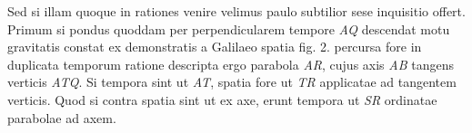             \pend               
                        \pstart \footnotesize Sed si illam quoque in rationes venire velimus paulo subtilior sese inquisitio offert. Primum si pondus\protect{} quoddam per perpendicularem tempore \textit{AQ} descendat motu gravitatis constat ex demonstratis a Galilaeo\protect{} spatia 
                     fig. 2. percursa fore in duplicata temporum ratione descripta ergo parabola \textit{AR}, cujus axis \textit{AB} tangens verticis \textit{ATQ}. Si tempora sint ut \textit{AT}, spatia fore ut \textit{TR} applicatae ad tangentem verticis. Quod si contra spatia sint ut   ex axe, erunt tempora ut \textit{SR} ordinatae parabolae ad axem.
\pend  
                     \pstart 
